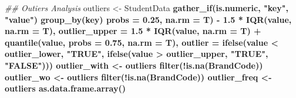 \documentclass[]{report}
\newenvironment{Shaded}{\begin{snugshade}}{\end{snugshade}}
\newcommand{\CommentTok}[1]{\textcolor[rgb]{0.56,0.35,0.01}{\textit{#1}}}
\newcommand{\DataTypeTok}[1]{\textcolor[rgb]{0.13,0.29,0.53}{#1}}
\newcommand{\FloatTok}[1]{\textcolor[rgb]{0.00,0.00,0.81}{#1}}
\newcommand{\KeywordTok}[1]{\textcolor[rgb]{0.13,0.29,0.53}{\textbf{#1}}}
\newcommand{\NormalTok}[1]{#1}
\newcommand{\OperatorTok}[1]{\textcolor[rgb]{0.81,0.36,0.00}{\textbf{#1}}}
\newcommand{\StringTok}[1]{\textcolor[rgb]{0.31,0.60,0.02}{#1}}
\begin{document}
\begin{Shaded}
\begin{Highlighting}[]
{{{{{\CommentTok{## Outiers Analysis}
\NormalTok{outliers <-}\StringTok{ }\NormalTok{StudentData }\OperatorTok{%
\StringTok{ }\KeywordTok{gather_if}\NormalTok{(is.numeric, }\StringTok{"key"}\NormalTok{, }\StringTok{"value"}\NormalTok{) }\OperatorTok{%
\StringTok{ }\KeywordTok{group_by}\NormalTok{(key) }\OperatorTok{%
 \DataTypeTok{probs =} \FloatTok{0.25}\NormalTok{, }\DataTypeTok{na.rm =}\NormalTok{ T) }\OperatorTok{-}\StringTok{ }\FloatTok{1.5} \OperatorTok{*}\StringTok{ }\KeywordTok{IQR}\NormalTok{(value, }\DataTypeTok{na.rm =}\NormalTok{ T), }
 \DataTypeTok{outlier_upper =} \FloatTok{1.5} \OperatorTok{*}\StringTok{ }\KeywordTok{IQR}\NormalTok{(value, }\DataTypeTok{na.rm =}\NormalTok{ T) }\OperatorTok{+}\StringTok{ }\KeywordTok{quantile}\NormalTok{(value, }
  \DataTypeTok{probs =} \FloatTok{0.75}\NormalTok{, }\DataTypeTok{na.rm =}\NormalTok{ T), }\DataTypeTok{outlier =} \KeywordTok{ifelse}\NormalTok{(value }\OperatorTok{<}\StringTok{ }
\StringTok{  }\NormalTok{outlier_lower, }\StringTok{"TRUE"}\NormalTok{, }\KeywordTok{ifelse}\NormalTok{(value }\OperatorTok{>}\StringTok{ }\NormalTok{outlier_upper, }
  \StringTok{"TRUE"}\NormalTok{, }\StringTok{"FALSE"}\NormalTok{)))}
\NormalTok{outlier_with <-}\StringTok{ }\NormalTok{outliers }\OperatorTok{%
\StringTok{ }\KeywordTok{filter}\NormalTok{(}\OperatorTok{!}\KeywordTok{is.na}\NormalTok{(BrandCode))}
\NormalTok{outlier_wo <-}\StringTok{ }\NormalTok{outliers }\OperatorTok{%
\StringTok{ }\KeywordTok{filter}\NormalTok{(}\OperatorTok{!}\KeywordTok{is.na}\NormalTok{(BrandCode))}
\NormalTok{outlier_freq <-}\StringTok{ }\NormalTok{outliers }\OperatorTok{%
\StringTok{ }\KeywordTok{as.data.frame.array}\NormalTok{() }\OperatorTok{%
}}}}}}}}}}}}
\end{Highlighting}
\end{Shaded}
\end{document}
